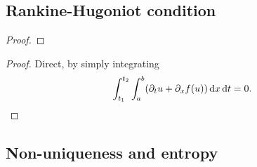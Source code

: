 \subsection{Rankine-Hugoniot condition}

\begin{theorem}
	
\end{theorem}

\begin{proof}
	
\end{proof}

\begin{remark}
	
\end{remark}

\begin{example}
	
\end{example}

\begin{theorem}
	
\end{theorem}

\begin{proof}
	Direct, by simply integrating
	\[
		\int_{t_1}^{t_2}\int_a^b \parentheses*{\partial_t u + \partial_x f\parentheses*{u}}\d x\d t = 0.
	\]
\end{proof}

\begin{remark}
	
\end{remark}


\subsection{Non-uniqueness and entropy}

\begin{example}
	
\end{example}

\begin{definition}
	
\end{definition}

\begin{remark}
	
\end{remark}

